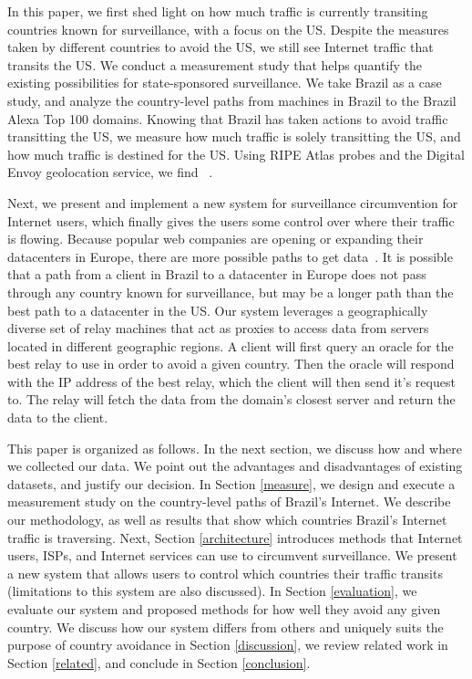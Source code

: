 In this paper, we first shed light on how much traffic is currently transiting countries known for surveillance, with a focus on the US.  Despite the measures taken by different countries to avoid the US, we still see Internet traffic that transits the US.  We conduct a measurement study that helps quantify the existing possibilities for state-sponsored surveillance.  We take Brazil as a case study, and analyze the country-level paths from machines in Brazil to the Brazil Alexa Top 100 domains.  Knowing that Brazil has taken actions to avoid traffic transitting the US, we measure how much traffic is solely transitting the US, and how much traffic is destined for the US.  Using RIPE Atlas probes and the Digital Envoy geolocation service, we find ~\cite{ripe_atlas, digital_envoy}.  

 Next, we present and implement a new system for surveillance circumvention for Internet users, which finally gives the users some control over where their traffic is flowing.  Because popular web companies are opening or expanding their datacenters in Europe, there are more possible paths to get data~\cite{eu_datacenters}.  It is possible that a path from a client in Brazil to a datacenter in Europe does not pass through any country known for surveillance, but may be a longer path than the best path to a datacenter in the US.  Our system leverages a geographically diverse set of relay machines that act as proxies to access data from servers located in different geographic regions.  A client will first query an oracle for the best relay to use in order to avoid a given country.  Then the oracle will respond with the IP address of the best relay, which the client will then send it's request to.  The relay will fetch the data from the domain's closest server and return the data to the client. 

This paper is organized as follows.  In the next section, we discuss how and where we collected our data.  We point out the advantages and disadvantages of existing datasets, and justify our decision.  In Section \ref{measure}, we design and execute a measurement study on the country-level paths of Brazil's Internet.  We describe our methodology, as well as results that show which countries Brazil's Internet traffic is traversing.  Next, Section \ref{architecture} introduces methods that Internet users, ISPs, and Internet services can use to circumvent surveillance.  We present a new system that allows users to control which countries their traffic transits (limitations to this system are also discussed).  In Section \ref{evaluation}, we evaluate our system and proposed methods for how well they avoid any given country.  We discuss how our system differs from others and uniquely suits the purpose of country avoidance in Section \ref{discussion}, we review related work in Section \ref{related}, and conclude in Section \ref{conclusion}.
